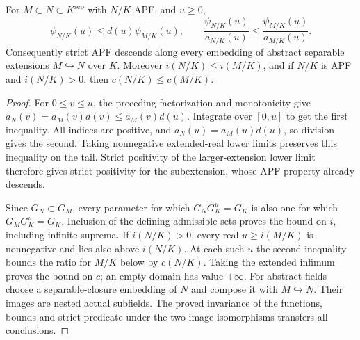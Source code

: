\begin{proposition}
\label{fw:strict-apf-descent}
\leanok
For $M\subset N\subset K^{\mathrm{sep}}$ with $N/K$ APF, and $u\geq0$,
\[
 \psi_{N/K}(u)\leq d(u)\psi_{M/K}(u),\qquad
 \frac{\psi_{N/K}(u)}{a_{N/K}(u)}
 \leq\frac{\psi_{M/K}(u)}{a_{M/K}(u)}.
\]
Consequently strict APF descends along every embedding of abstract
separable extensions $M\hookrightarrow N$ over $K$.
Moreover $i(N/K)\leq i(M/K)$, and if $N/K$ is APF and $i(N/K)>0$,
then $c(N/K)\leq c(M/K)$.
\end{proposition}
\begin{proof}
For $0\leq v\leq u$, the preceding factorization and monotonicity give
$a_N(v)=a_M(v)d(v)\leq a_M(v)d(u)$. Integrate over $[0,u]$ to get
the first inequality. All indices are positive, and
$a_N(u)=a_M(u)d(u)$, so division gives the second. Taking nonnegative
extended-real lower limits preserves this inequality on the tail.
Strict positivity of the larger-extension lower limit therefore gives
strict positivity for the subextension, whose APF property already
descends.

Since $G_N\subset G_M$, every parameter for which $G_NG_K^u=G_K$
is also one for which $G_MG_K^u=G_K$. Inclusion of the defining
admissible sets proves the bound on $i$, including infinite suprema.
If $i(N/K)>0$, every real $u\geq i(M/K)$ is nonnegative and lies
also above $i(N/K)$. At each such $u$ the second inequality bounds the
ratio for $M/K$ below by $c(N/K)$. Taking the extended infimum proves
the bound on $c$; an empty domain has value $+\infty$.
For abstract fields choose a separable-closure embedding of $N$ and
compose it with $M\hookrightarrow N$. Their images are nested actual
subfields. The proved invariance of the functions, bounds and strict
predicate under the two image isomorphisms transfers all conclusions.
\end{proof}

